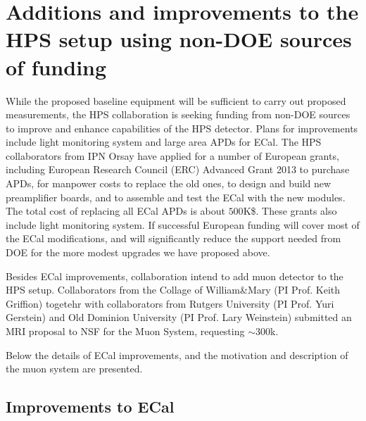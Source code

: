 \appendix
\renewcommand*{\thesubsection}{\thesection.\arabic{subsection}}
\renewcommand*{\thesubsubsection}{\thesubsection.\arabic{subsubsection}}

\section{Additions and improvements to the HPS setup using non-DOE sources of funding}

While the proposed baseline equipment will be sufficient to carry out proposed measurements, the HPS collaboration is seeking funding from non-DOE sources to improve and enhance capabilities of the HPS detector. Plans for improvements include light monitoring system and large area APDs for ECal.  The HPS collaborators from IPN Orsay have applied for a number of European grants, including European Research Council (ERC) Advanced Grant 2013 to purchase APDs, for manpower costs to replace the old ones, to design and build 
new preamplifier boards, and to assemble and test the ECal with the new modules. The total cost of replacing all ECal APDs is about $500$K\$. 
These grants also include light monitoring system. If successful European funding will cover most of the ECal modifications, and will significantly reduce the support needed from DOE for the more modest upgrades we have proposed above. 

Besides ECal improvements, collaboration intend to add muon detector to the HPS setup. Collaborators from the Collage of William\&Mary (PI Prof. Keith Griffion) togetehr with collaborators from Rutgers University (PI Prof. Yuri Gerstein) and Old Dominion University (PI Prof. Lary Weinstein) submitted an MRI proposal to NSF for the Muon System, requesting $\sim 300$k.  

Below the details of ECal improvements, and the motivation and description of the muon system are presented. 

\subsection{Improvements to ECal}

